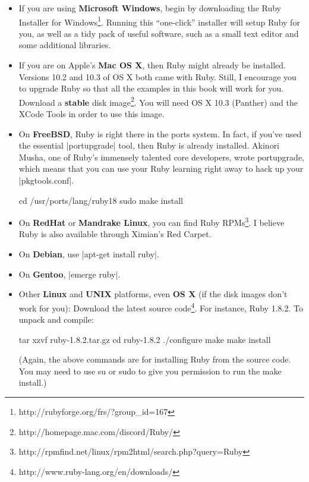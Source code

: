 \documentclass[12pt,twoside]{report}
\begin{document}
\begin{itemize}

\item 
If you are using \textbf{Microsoft Windows}, begin by downloading the
Ruby Installer for
Windows\footnote{http://rubyforge.org/frs/?group\_id=167}. Running
this ``one-click'' installer will setup Ruby for you, as well as a
tidy pack of useful software, such as a small text editor and some
additional libraries.

\item If you are on Apple's \textbf{Mac OS X}, then
Ruby might already be installed. Versions 10.2 and 10.3 of OS X both
came with Ruby. Still, I encourage you to upgrade Ruby so that all the
examples in this book will work for you. Download a \textbf{stable}
disk image\footnote{http://homepage.mac.com/discord/Ruby/}. You will
need OS X 10.3 (Panther) and the XCode Tools in order to use this
image.

\item On \textbf{FreeBSD}, Ruby is right there in the ports
system. In fact, if you've used the essential
\consoleinline|portupgrade| tool, then Ruby is already
installed. Akinori Musha, one of Ruby's immensely talented core
developers, wrote portupgrade, which means that you can use your Ruby
learning right away to hack up your
\consoleinline|pkgtools.conf|.

\begin{consolecode}
 cd /usr/ports/lang/ruby18 
 sudo make install
\end{consolecode}

\item On \textbf{RedHat} or \textbf{Mandrake Linux}, you can find Ruby
RPMs\footnote{http://rpmfind.net/linux/rpm2html/search.php?query=Ruby}. I
believe Ruby is also available through Ximian's Red Carpet.

\item On \textbf{Debian}, use 
\consoleinline|apt-get install ruby|.

\item On \textbf{Gentoo}, \consoleinline|emerge ruby|.

\item Other \textbf{Linux} and \textbf{UNIX}
platforms, even \textbf{OS X} (if the disk images don't work for you): Download
the latest source code\footnote{http://www.ruby-lang.org/en/downloads/}. 
For instance, Ruby 1.8.2. To unpack and compile:

\begin{consolecode}
 tar xzvf ruby-1.8.2.tar.gz 
 cd ruby-1.8.2 
 ./configure 
 make
 make install
\end{consolecode}

(Again, the above commands are for installing Ruby from the source
code. You may need to use su or sudo to give you permission to run the
make install.)

\end{itemize}
\end{document}
